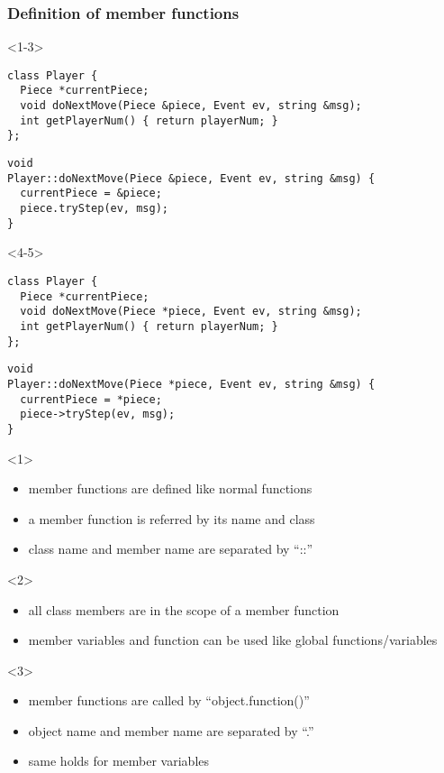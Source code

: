\documentclass{slides}
\begin{document}
\begin{frame}
  \frametitle{Definition of member functions}

  \begin{onlyenv}<1-3>
\begin{lstlisting}[title={\footnotesize\bfseries Player.hpp}]
class Player {
  Piece *currentPiece;
  void doNextMove(Piece &piece, Event ev, string &msg);
  int getPlayerNum() { return playerNum; }
};
\end{lstlisting}

\begin{lstlisting}[title={\footnotesize\bfseries Player.cpp}]
void
Player::doNextMove(Piece &piece, Event ev, string &msg) {
  currentPiece = &piece;
  piece.tryStep(ev, msg);
}
\end{lstlisting}
  \end{onlyenv}

  \begin{onlyenv}<4-5>
\begin{lstlisting}[title={\footnotesize\bfseries Player.hpp}]
class Player {
  Piece *currentPiece;
  void doNextMove(Piece *piece, Event ev, string &msg);
  int getPlayerNum() { return playerNum; }
};
\end{lstlisting}

\begin{lstlisting}[title={\footnotesize\bfseries Player.cpp}]
void
Player::doNextMove(Piece *piece, Event ev, string &msg) {
  currentPiece = *piece;
  piece->tryStep(ev, msg);
}
\end{lstlisting}
  \end{onlyenv}

  \begin{onlyenv}<1>
    \begin{itemize}
    \item member functions are defined like normal functions
    \item a member function is referred by its name and class
    \item class name and member name are separated by ``::''
    \end{itemize}
  \end{onlyenv}

  \begin{onlyenv}<2>
    \begin{itemize}
    \item all class members are in the scope of a member function
    \item member variables and function can be used like global
      functions/variables
    \end{itemize}
  \end{onlyenv}
  \begin{onlyenv}<3>
    \begin{itemize}
    \item member functions are called by ``object.function()''
    \item object name and member name are separated by ``.''
    \item same holds for member variables
    \end{itemize}
  \end{onlyenv}


\end{frame}
\end{document}
